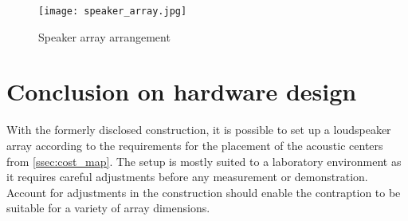 \begin{figure}[H]
	\centering
    \texttt{[image: speaker\_array.jpg]}
    \caption{Speaker array arrangement}
    \label{fig:array_pic}
\end{figure}
\section{Conclusion on hardware design}
With the formerly disclosed construction, it is possible to set up a loudspeaker array according to the requirements for the placement of the acoustic centers from \autoref{ssec:cost_map}. The setup is mostly suited to a laboratory environment as it requires careful adjustments before any measurement or demonstration. Account for adjustments in the construction should enable the contraption to be suitable for a variety of array dimensions.




